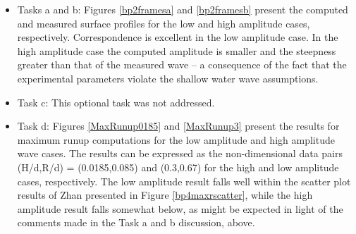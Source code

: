 \begin{itemize}
\item Tasks a and b:
Figures \ref{bp2framesa} and \ref{bp2framesb} present the computed and measured surface profiles for the low and high amplitude cases, respectively.  Correspondence is excellent in the low amplitude case.  In the high amplitude case the computed amplitude is smaller and the steepness greater than that of the measured wave -- a consequence of the fact that the experimental parameters violate the shallow water wave assumptions.
\item Task c: This optional task was not addressed.
\item Task d:  Figures \ref{MaxRunup0185} and \ref{MaxRunup3} present the results for maximum runup computations for the low amplitude and high amplitude wave cases.  The results can be expressed as the non-dimensional data pairs (H/d,R/d) = (0.0185,0.085) and (0.3,0.67) for the high and low amplitude cases, respectively.  The low amplitude result falls well within the scatter plot results of Zhan \cite{bp-description} presented in Figure \ref{bp4maxrscatter}, while the high amplitude result falls somewhat below, as might be expected in light of the comments made in the Task a and b discussion, above.
\end{itemize}


